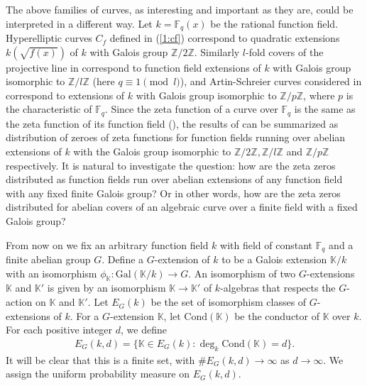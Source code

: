 \documentclass[12pt]{amsart}
\theoremstyle{plain}
\begin{document}
The above families of curves, as interesting and important as they are, could be interpreted in a different way. Let $k={{\mathbb F}_q}(x)$ be the rational function field. Hyperelliptic curves $C_f$ defined in (\ref{1:cf}) correspond to quadratic extensions $k(\sqrt{f(x)})$ of $k$ with Galois group ${{\mathbb Z}}/2{{\mathbb Z}}$. Similarly $l$-fold covers of the projective line in \cite{xio} correspond to function field extensions of $k$ with Galois group isomorphic to ${{\mathbb Z}}/l{{\mathbb Z}}$ (here $q \equiv 1 \pmod{l}$), and Artin-Schreier curves considered in \cite{buc3} correspond to extensions of $k$ with Galois group isomorphic to ${{\mathbb Z}}/p{{\mathbb Z}}$, where $p$ is the characteristic of ${{\mathbb F}_q}$. Since the zeta function of a curve over ${{\mathbb F}_q}$ is the same as the zeta function of its function field (\cite{mor}), the results of \cite{fai,xio,buc3} can be summarized as distribution of zeroes of zeta functions for function fields running over abelian extensions of $k$ with the Galois group isomorphic to ${{\mathbb Z}}/2{{\mathbb Z}},{{\mathbb Z}}/l{{\mathbb Z}}$ and ${{\mathbb Z}}/p{{\mathbb Z}}$ respectively. It is natural to investigate the question: how are the zeta zeros distributed as function fields run over abelian extensions of any function field with any fixed finite Galois group? Or in other words, how are the zeta zeros distributed for abelian covers of an algebraic curve over a finite field with a fixed Galois group?

From now on we fix an arbitrary function field $k$ with field of constant ${{\mathbb F}_q}$ and a finite abelian group $G$. Define a $G$-extension of $k$ to be a Galois extension ${{\mathbb K}}/k$ with an isomorphism ${\phi_{{\mathbb K}}}:\mathrm{Gal}({{\mathbb K}}/k) \to G$. An isomorphism of two $G$-extensions ${{\mathbb K}}$ and ${{\mathbb K}}'$ is given by an isomorphism ${{\mathbb K}} \to {{\mathbb K}}'$ of $k$-algebras that respects the $G$-action on ${{\mathbb K}}$ and ${{\mathbb K}}'$. Let $E_G(k)$ be the set of isomorphism classes of $G$-extensions of $k$. For a $G$-extension ${{\mathbb K}}$, let $\mathrm{Cond}({{\mathbb K}})$ be the conductor of ${{\mathbb K}}$ over $k$. For each positive integer $d$, we define
\begin{eqnarray} \label{1:ekg} E_G(k,d)=\{{{\mathbb K}} \in E_G(k): \deg_k \mathrm{Cond}({{\mathbb K}})=d\}. \end{eqnarray}
It will be clear that this is a finite set, with $\#E_G(k,d) \to \infty$ as $d \to \infty$. We assign the uniform probability measure on $E_G(k,d)$.
\end{document}
